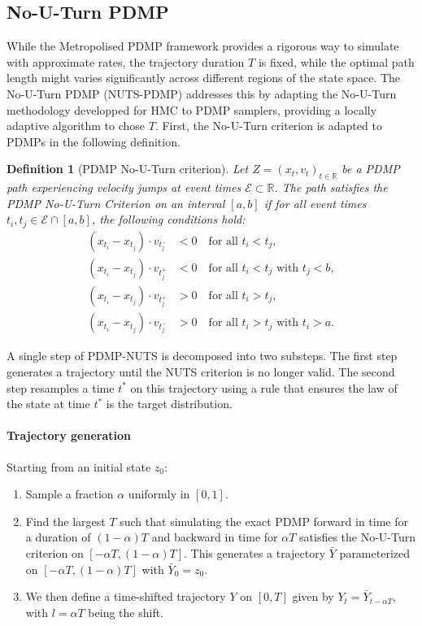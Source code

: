 \documentclass{article}
\newtheorem{definition}{Definition}
\begin{document}
\subsection{No-U-Turn PDMP}
\label{sec:nuts_pdmp}

While the Metropolised PDMP framework provides a rigorous way to simulate with approximate rates, the trajectory duration $T$ is fixed, while the optimal path length might varies significantly across different regions of the state space. The No-U-Turn PDMP (NUTS-PDMP) \cite{chevallier2025practicalpdmpsamplingmetropolis} addresses this by adapting the No-U-Turn methodology developped for HMC to PDMP samplers, providing a locally adaptive algorithm to chose $T$.
%
First, the No-U-Turn criterion is adapted to PDMPs in the following definition.

\begin{definition}[PDMP No-U-Turn criterion]
    Let $Z = (x_t, v_t)_{t \in \mathbb{R}}$ be a PDMP path experiencing velocity jumps at event times $\mathcal{E} \subset \mathbb{R}$. The path satisfies the PDMP No-U-Turn Criterion on an interval $[a, b]$ if for all event times $t_i, t_j \in \mathcal{E} \cap [a, b]$, the following conditions hold:
    \begin{align*}
        (x_{t_i} - x_{t_j}) \cdot v_{t_j^-} &< 0 \quad \text{for all } t_i < t_j, \\
        (x_{t_i} - x_{t_j}) \cdot v_{t_j^+} &< 0 \quad \text{for all } t_i < t_j \text{ with } t_j < b, \\
        (x_{t_i} - x_{t_j}) \cdot v_{t_j^+} &> 0 \quad \text{for all } t_i > t_j, \\
        (x_{t_i} - x_{t_j}) \cdot v_{t_j^-} &> 0 \quad \text{for all } t_i > t_j \text{ with } t_i > a.
    \end{align*}
\end{definition}

A single step of PDMP-NUTS is decomposed into two substeps. The first step generates a trajectory until the NUTS criterion is no longer valid. The second step resamples a time $t^*$ on this trajectory using a rule that ensures the law of the state at time $t^*$ is the target distribution.

\paragraph{Trajectory generation}
Starting from an initial state $z_0$:
\begin{enumerate}
    \item Sample a fraction $\alpha$ uniformly in $[0,1]$.
    \item Find the largest $T$ such that simulating the exact PDMP forward in time for a duration of $(1-\alpha)T$ and backward in time for $\alpha T$ satisfies the No-U-Turn criterion on $[-\alpha T, (1-\alpha)T]$. This generates a trajectory $\bar{Y}$ parameterized on $[-\alpha T, (1-\alpha)T]$ with $\bar{Y}_0 = z_0$. 
    \item We then define a time-shifted trajectory $Y$ on $[0, T]$ given by $Y_t = \bar{Y}_{t - \alpha T}$, with $l = \alpha T$ being the shift.
\end{enumerate}
\end{document}
